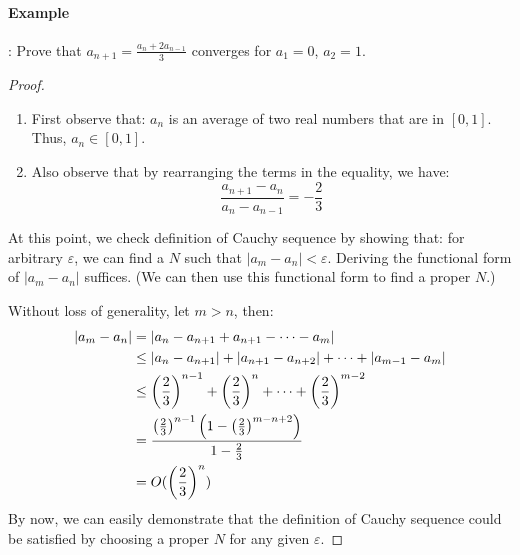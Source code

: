 \documentclass[12pt]{article}
\renewcommand{\epsilon}{\varepsilon}
\theoremstyle{definition}
\theoremstyle{plain}
\begin{document}
\paragraph{Example}: 
Prove that $a_{n+1} = \frac{a_n + 2a_{n-1}}{3}$ converges for $a_1 = 0$, $a_2 = 1$.

\begin{proof}
    \begin{enumerate}[Step 1]
        \item First observe that: $a_n$ is an average of two real numbers that are in $[0,1]$. Thus, 
            $a_n \in [0,1]$.

        \item Also observe that by rearranging the terms in the equality, we 
            have: 
            \[
                \frac{a_{n+1} - a_n}{a_n - a_{n-1}} = - \frac{2}{3}
            \]
    \end{enumerate}
    At this point, we check definition of Cauchy sequence by showing that: for 
    arbitrary $\epsilon$, we can find a $N$ such that $|a_m - a_n| < 
    \varepsilon$. Deriving the functional form of $|a_m  -a_n|$ suffices. (We 
    can then use this functional form to find a proper $N$.)

    Without loss of generality, let $m > n$, then:
    \[
        \aligned
        |a_m - a_n|& = |a_n - a_{n+1} + a_{n+1} - \cdots - a_m|\\
        & \le |a_n - a_{n+1}| + |a_{n+1} - a_{n+2} | + \cdots + |a_{m-1} - a_m| 
        \\
        & \le \left( \frac{2}{3} \right)^{n-1} + \left( \frac{2}{3} \right)^n + 
        \cdots + \left( \frac{2}{3} \right)^{m-2} \\
        & = \frac{\left( \frac{2}{3} \right)^{n-1}\left( 1 - \left( 
                    \frac{2}{3} 
        \right)^{m-n+2} \right)}{1 -  \frac{2}{3}} \\
        & = O(\left( \frac{2}{3} \right)^n)
        \endaligned
    \]
    By now, we can easily demonstrate that the definition of Cauchy sequence 
    could be satisfied by choosing a proper $N$ for any given 
    $\varepsilon$.
\end{proof}
\end{document}
